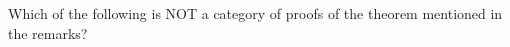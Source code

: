 \documentclass[nooutcomes]{ximera}
\begin{document}
\begin{question}
Which of the following is NOT a category of proofs of the theorem mentioned in the remarks?
\begin{multipleChoice}
\end{multipleChoice}
\end{question}

%
%
\end{document}
